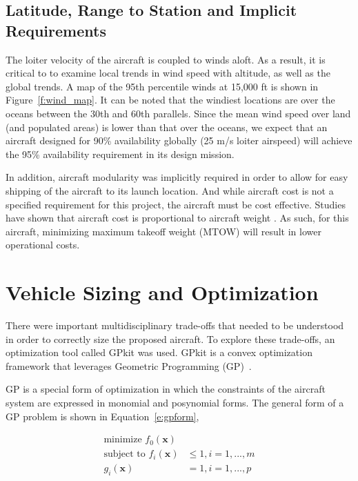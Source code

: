 \documentclass[journal]{aiaa-tc}%
\begin{document}
\subsection{Latitude, Range to Station and Implicit Requirements}

The loiter velocity of the aircraft is coupled to winds aloft. As a result, it is critical to to examine local trends in wind speed with altitude, as well as the global trends. A map of the 95th percentile winds at 15,000 ft is shown in Figure~\ref{f:wind_map}. It can be noted that the windiest locations are over the oceans between the 30th and 60th parallels. Since the mean wind speed over land (and populated areas) is lower than that over the oceans, we expect that an aircraft designed for 90\% availability globally (25 m/s loiter airspeed) will achieve the 95\% availability requirement in its design mission. 

In addition, aircraft modularity was implicitly required in order to allow for easy shipping of the aircraft to its launch location. And while aircraft cost is not a specified requirement for this project, the aircraft must be cost effective. Studies have shown that aircraft cost is proportional to aircraft weight \cite{costeco}. As such, for this aircraft, minimizing maximum takeoff weight (MTOW) will result in lower operational costs. 

\section{Vehicle Sizing and Optimization}
\label{Vehicle Sizing and Optimization}

There were important multidisciplinary trade-offs that needed to be understood in order to correctly size the proposed aircraft. To explore these trade-offs, an optimization tool called GPkit was used. GPkit is a convex optimization framework that leverages Geometric Programming (GP)~\cite{GPkit}.

GP is a special form of optimization in which the constraints of the aircraft system are expressed in monomial and posynomial forms. The general form of a GP problem is shown in Equation~\ref{e:gpform},

\begin{align} 
\label{e:gpform}
\text{minimize } f_0(\mathbf{x}) & \nonumber \\
\text{subject to  } f_i(\mathbf{x}) &\leq 1, i=1,...,m \\
g_i (\mathbf{x}) &= 1, i = 1,...,p \nonumber
\end{align}
 
\end{document}

